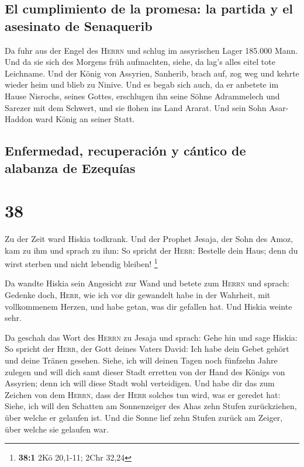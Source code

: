 \hypertarget{el-cumplimiento-de-la-promesa-la-partida-y-el-asesinato-de-senaquerib}{%
\subsection{El cumplimiento de la promesa: la partida y el asesinato de
Senaquerib}\label{el-cumplimiento-de-la-promesa-la-partida-y-el-asesinato-de-senaquerib}}

 Da fuhr aus der Engel des \textsc{Herrn} und schlug im
assyrischen Lager 185.000 Mann. Und da sie sich des Morgens früh
aufmachten, siehe, da lag's alles eitel tote Leichname. 
Und der König von Assyrien, Sanherib, brach auf, zog weg und kehrte
wieder heim und blieb zu Ninive.  Und es begab sich auch,
da er anbetete im Hause Nisrochs, seines Gottes, erschlugen ihn seine
Söhne Adrammelech und Sarezer mit dem Schwert, und sie flohen ins Land
Ararat. Und sein Sohn Asar-Haddon ward König an seiner Statt.

\hypertarget{enfermedad-recuperaciuxf3n-y-cuxe1ntico-de-alabanza-de-ezequuxedas}{%
\subsection{Enfermedad, recuperación y cántico de alabanza de
Ezequías}\label{enfermedad-recuperaciuxf3n-y-cuxe1ntico-de-alabanza-de-ezequuxedas}}

\hypertarget{section-37}{%
\section{38}\label{section-37}}

 Zu der Zeit ward Hiskia todkrank. Und der Prophet Jesaja,
der Sohn des Amoz, kam zu ihm und sprach zu ihm: So spricht der
\textsc{Herr}: Bestelle dein Haus; denn du wirst sterben und nicht
lebendig bleiben! \footnote{\textbf{38:1} 2Kö 20,1-11; 2Chr 32,24}

 Da wandte Hiskia sein Angesicht zur Wand und betete zum
\textsc{Herrn}  und sprach: Gedenke doch, \textsc{Herr},
wie ich vor dir gewandelt habe in der Wahrheit, mit vollkommenem Herzen,
und habe getan, was dir gefallen hat. Und Hiskia weinte sehr.

 Da geschah das Wort des \textsc{Herrn} zu Jesaja und
sprach:  Gehe hin und sage Hiskia: So spricht der
\textsc{Herr}, der Gott deines Vaters David: Ich habe dein Gebet gehört
und deine Tränen gesehen. Siehe, ich will deinen Tagen noch fünfzehn
Jahre zulegen  und will dich samt dieser Stadt erretten
von der Hand des Königs von Assyrien; denn ich will diese Stadt wohl
verteidigen.  Und habe dir das zum Zeichen von dem
\textsc{Herrn}, dass der \textsc{Herr} solches tun wird, was er geredet
hat:  Siehe, ich will den Schatten am Sonnenzeiger des
Ahas zehn Stufen zurückziehen, über welche er gelaufen ist. Und die
Sonne lief zehn Stufen zurück am Zeiger, über welche sie gelaufen war.


